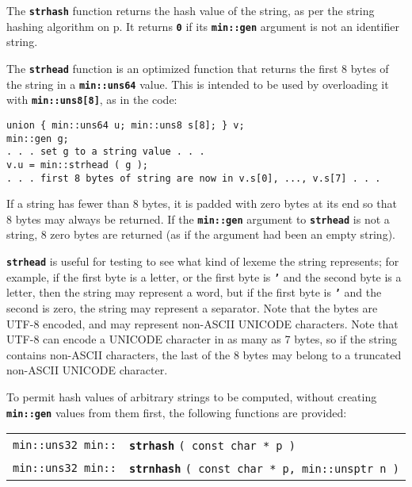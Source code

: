 \documentclass[12pt]{article}
\makeatletter
\newcommand{\TT}[1]{{\tt \bfseries #1}}
\newcommand{\ttindex}[1]{\index{#1@{\tt #1}}}
\newcommand{\pagref}[1]{p\pageref{#1}}
\newenvironment{indpar}[1][0.3in]%
	{\begin{list}{}%
		     {\setlength{\itemsep}{0in}%
		      \setlength{\topsep}{0in}%
		      \setlength{\parsep}{1ex}%
		      \setlength{\labelwidth}{#1}%
		      \setlength{\leftmargin}{#1}%
		      \addtolength{\leftmargin}{\labelsep}}%
	 \item}%
	{\end{list}}
\newcommand{\LABEL}[1]{\label{#1}}
\newcommand{\MINKEY}[1]%
	   {\TT{#1}\ttindex{min::#1}\ttindex{#1}}
\makeatother
\begin{document}
The \TT{strhash} function returns the hash value of the string,
as per the string hashing algorithm on \pagref{HASH-ALGORITHM}.
It returns \TT{0} if its \TT{min::gen} argument is not an identifier
string.

The \TT{strhead} function is an optimized function that
returns the first 8 bytes of the string
in a \TT{min::uns64} value.  This is intended to be used by
overloading it with \TT{min::uns8[8]}, as in the code:

\begin{indpar}\begin{verbatim}
union { min::uns64 u; min::uns8 s[8]; } v;
min::gen g;
. . . set g to a string value . . .
v.u = min::strhead ( g );
. . . first 8 bytes of string are now in v.s[0], ..., v.s[7] . . .
\end{verbatim}\end{indpar}

If a string has fewer than 8 bytes, it is padded with zero bytes
at its end so that 8 bytes may always be returned.  If the \TT{min::gen}
argument to \TT{strhead} is not a string, 8 zero bytes are returned
(as if the argument had been an empty string).

\TT{strhead} is useful for testing
to see what kind of lexeme the string represents; for
example, if the first byte is a letter, or the first byte is \TT{'}
and the second byte is a letter, then the string may represent a
word, but if the first byte is \TT{'} and the second is zero,
the string may represent a separator.
Note that the bytes are UTF-8 encoded, and may represent non-ASCII
UNICODE characters.  Note that UTF-8 can encode a UNICODE character
in as many as 7 bytes, so if the string contains non-ASCII
characters, the last of the 8 bytes may belong to a truncated
non-ASCII UNICODE character.

To permit hash values of arbitrary strings to be computed,
without creating \TT{min::gen} values from them first,
the following functions are provided:

\begin{indpar}\begin{tabular}{r@{}l}
\verb|min::uns32 min::| & \MINKEY{strhash} \verb|( const char * p )|
\LABEL{MIN::STRHASH} \\
\verb|min::uns32 min::|
    & \MINKEY{strnhash} \verb|( const char * p, min::unsptr n )|
\LABEL{MIN::STRNHASH} \\
\end{tabular}\end{indpar}
\end{document}
